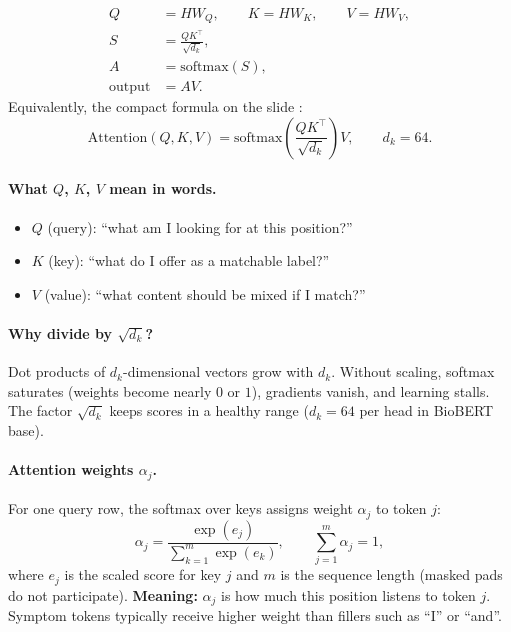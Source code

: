 \begin{align}
  Q &= H W_Q, \qquad K = H W_K, \qquad V = H W_V,
  \label{eq:QKV}\\
  S &= \frac{QK^{\top}}{\sqrt{d_k}},
  \label{eq:S}\\
  A &= \mathrm{softmax}(S),
  \label{eq:A}\\
  \mathrm{output} &= A V.
  \label{eq:AV}
\end{align}
Equivalently, the compact formula on the slide \citep{vaswani2017attention}:
\begin{equation}
  \mathrm{Attention}(Q,K,V)
  = \mathrm{softmax}\!\left(\frac{QK^{\top}}{\sqrt{d_k}}\right)V,
  \qquad d_k = 64.
  \label{eq:attn}
\end{equation}

\paragraph{What \(Q\), \(K\), \(V\) mean in words.}
\begin{itemize}
  \item \(Q\) (query): ``what am I looking for at this position?''
  \item \(K\) (key): ``what do I offer as a matchable label?''
  \item \(V\) (value): ``what content should be mixed if I match?''
\end{itemize}

\paragraph{Why divide by \(\sqrt{d_k}\)?}
Dot products of \(d_k\)-dimensional vectors grow with \(d_k\).
Without scaling, softmax saturates (weights become nearly \(0\) or \(1\)), gradients vanish, and learning stalls.
The factor \(\sqrt{d_k}\) keeps scores in a healthy range (\(d_k=64\) per head in BioBERT base).

\paragraph{Attention weights \(\alpha_j\).}
For one query row, the softmax over keys assigns weight \(\alpha_j\) to token \(j\):
\begin{equation}
  \alpha_j = \frac{\exp(e_j)}{\sum_{k=1}^{m}\exp(e_k)}, \qquad \sum_{j=1}^{m}\alpha_j = 1,
  \label{eq:alpha}
\end{equation}
where \(e_j\) is the scaled score for key \(j\) and \(m\) is the sequence length (masked pads do not participate).
\textbf{Meaning:} \(\alpha_j\) is how much this position listens to token \(j\).
Symptom tokens typically receive higher weight than fillers such as ``I'' or ``and''.

